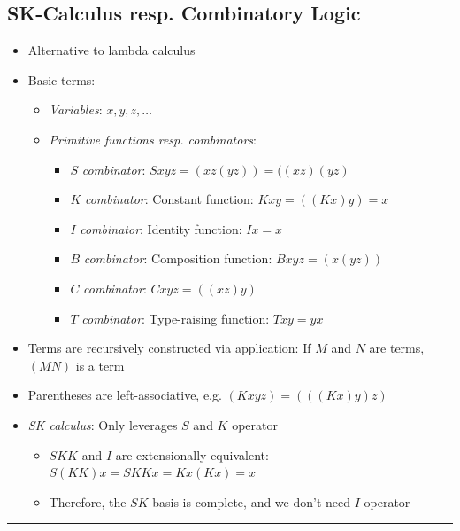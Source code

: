 \subsection*{SK-Calculus resp. Combinatory Logic}
\begin{itemize}
    \item Alternative to lambda calculus
    \item Basic terms:
    \begin{itemize}
        \item \emph{Variables}: $x, y, z, \dots$
        \item \emph{Primitive functions resp. combinators}: 
        \begin{itemize}
            \item $S$ \emph{combinator}: $Sxyz = (xz(yz)) = ((xz)(yz)$
            \item $K$ \emph{combinator}: Constant function: $Kxy = ((Kx)y) = x$
            \item $I$ \emph{combinator}: Identity function: $Ix = x$
            \item $B$ \emph{combinator}: Composition function: $Bxyz = (x(yz))$
            \item $C$ \emph{combinator}: $Cxyz = ((xz)y)$
            \item $T$ \emph{combinator}: Type-raising function: $Txy = yx$
        \end{itemize}
    \end{itemize}
    \item Terms are recursively constructed via application: If $M$ and $N$ are terms, $(MN)$ is a term
    \item Parentheses are left-associative, e.g. $(Kxyz) = (((Kx)y)z)$
    \item \emph{SK calculus}: Only leverages $S$ and $K$ operator
    \begin{itemize}
        \item $SKK$ and $I$ are extensionally equivalent: $S(KK)x = SKKx = K x(K x) = x$
        \item Therefore, the $SK$ basis is complete, and we don't need $I$ operator
    \end{itemize}
\end{itemize}

{\color{black}\hrule height 0.001mm}

